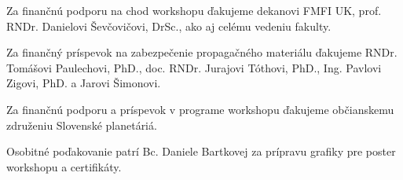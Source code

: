 \documentclass[a4paper]{report}
\begin{document}
    \vspace{3ex}

    Za finančnú podporu na chod workshopu ďakujeme dekanovi FMFI UK, prof. RNDr. Danielovi Ševčovičovi, DrSc.,
    ako aj celému vedeniu fakulty.

    Za finančný príspevok na zabezpečenie propagačného materiálu ďakujeme
    RNDr. Tomášovi Paulechovi, PhD., doc. RNDr. Jurajovi Tóthovi, PhD., Ing. Pavlovi Zigovi, PhD. a Jarovi Šimonovi.

    Za finančnú podporu a príspevok v programe workshopu ďakujeme občianskemu združeniu Slovenské planetáriá.

    Osobitné poďakovanie patrí Bc. Daniele Bartkovej za prípravu grafiky pre poster workshopu a certifikáty.
\end{document}
